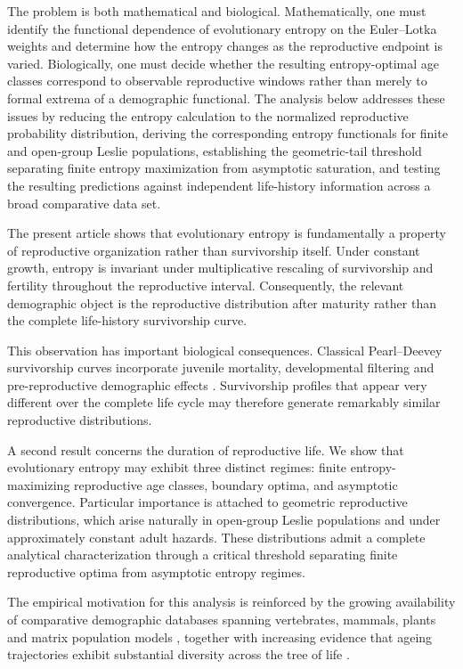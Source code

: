 \documentclass[10pt,a4paper]{amsart}
\theoremstyle{definition}
\theoremstyle{remark}
\numberwithin{equation}{section}
\begin{document}
The problem is both mathematical and biological. Mathematically, one must identify the functional dependence of evolutionary entropy on the Euler--Lotka weights and determine how the entropy changes as the reproductive endpoint is varied. Biologically, one must decide whether the resulting entropy-optimal age classes correspond to observable reproductive windows rather than merely to formal extrema of a demographic functional. The analysis below addresses these issues by reducing the entropy calculation to the normalized reproductive probability distribution, deriving the corresponding entropy functionals for finite and open-group Leslie populations, establishing the geometric-tail threshold separating finite entropy maximization from asymptotic saturation, and testing the resulting predictions against independent life-history information across a broad comparative data set.

The present article shows that evolutionary entropy is fundamentally a
property of reproductive organization rather than survivorship itself.
Under constant growth, entropy is invariant under multiplicative
rescaling of survivorship and fertility throughout the reproductive
interval. Consequently, the relevant demographic object is the
reproductive distribution after maturity rather than
the complete life-history survivorship curve.

This observation has important biological consequences.
Classical Pearl--Deevey survivorship curves incorporate juvenile
mortality, developmental filtering and pre-reproductive demographic
effects \cite{Pearl1928,Deevey}.
Survivorship profiles that appear very different over the complete life
cycle may therefore generate remarkably similar reproductive
distributions.

A second result concerns the duration of reproductive life.
We show that evolutionary entropy may exhibit three distinct regimes:
finite entropy-maximizing reproductive age classes, boundary optima,
and asymptotic convergence.
Particular importance is attached to geometric reproductive
distributions, which arise naturally in open-group Leslie populations
and under approximately constant adult hazards.
These distributions admit a complete analytical characterization
through a critical threshold separating finite reproductive optima from
asymptotic entropy regimes.

The empirical motivation for this analysis is reinforced by the growing
availability of comparative demographic databases spanning vertebrates,
mammals, plants and matrix population models
\cite{Tacutu2018,deMagalhaes2009,
SalgueroGomez2015COMPADRE,AnAgeDatabase,PanTHERIA,
COMPADRE,COMADRE},
together with increasing evidence that ageing trajectories exhibit
substantial diversity across the tree of life
\cite{Jones2014,VAU}.
\end{document}
